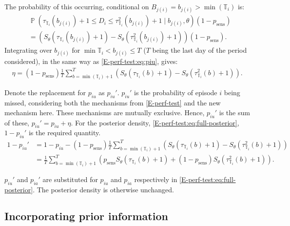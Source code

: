 \documentclass[12pt, letterpaper]{article} %
\DeclareMathOperator{\prob}{\mathbb{P}}
\newcommand{\psens}{p_\text{sens}}
\newcommand{\sched}{\mathbb{T}}
\begin{document}
The probability of this occurring, conditional on $B_{j(i)} = b_{j(i)} > \min(\sched_i)$ is:
\begin{align}
&\prob \left(
    \tau_{\sched_i}(b_{j(i)}) + 1 \leq D_i \leq \tau^2_{\sched_i}(b_{j(i)}) + 1
    \mid b_{j(i)},
\theta \right) (1 - \psens) \\
&= \left( S_\theta(\tau_{\sched_i}(b_{j(i)}) + 1) - S_\theta(\tau^2_{\sched_i}(b_{j(i)}) + 1) \right) (1 - \psens).
\end{align}
Integrating over $b_{j(i)}$ for $\min \sched_i < b_{j(i)} \leq T$ ($T$ being the last day of the period considered), in the same way as \cref{E-perf-test:eq:piu}, gives:
\begin{align}
\eta = (1 - p_\text{sens})\frac{1}{T} \sum_{b=\min(\sched_i) + 1}^T \left( S_\theta(\tau_{\sched_i}(b) + 1) - S_\theta(\tau^2_{\sched_i}(b) + 1) \right).
\end{align}

Denote the replacement for $p_{iu}$ as $p_{iu}'$.
$p_{iu}'$ is the probability of episode $i$ being missed, considering both the mechanisms from \cref{E-perf-test} and the new mechanism here.
These mechanisms are mutually exclusive.
Hence, $p_{iu}'$ is the sum of these, $p_{iu}' = p_{iu} + \eta$.
For the posterior density, \cref{E-perf-test:eq:full-posterior}, $1 - p_{iu}'$ is the required quantity.
\begin{align}
1 - p_{iu}'
&= 1 - p_{iu} - (1 - p_\text{sens})\frac{1}{T} \sum_{b=\min(\sched_i) + 1}^T \left( S_\theta(\tau_{\sched_i}(b) + 1) - S_\theta(\tau^2_{\sched_i}(b) + 1) \right) \\
&= \frac{1}{T} \sum_{b=\min(\sched_i) + 1}^T \left( p_\text{sens} S_\theta(\tau_{\sched_i}(b) + 1) + (1 - p_\text{sens}) S_\theta(\tau^2_{\sched_i}(b) + 1)\right).
\label{imperf-test:eq:pit-prime}
\end{align}

$p_{iu}'$ and $p_{ia}'$ are substituted for $p_{iu}$ and $p_{ia}$ respectively in \cref{E-perf-test:eq:full-posterior}.
The posterior density is otherwise unchanged.



\subsection{Incorporating prior information}

\end{document}
